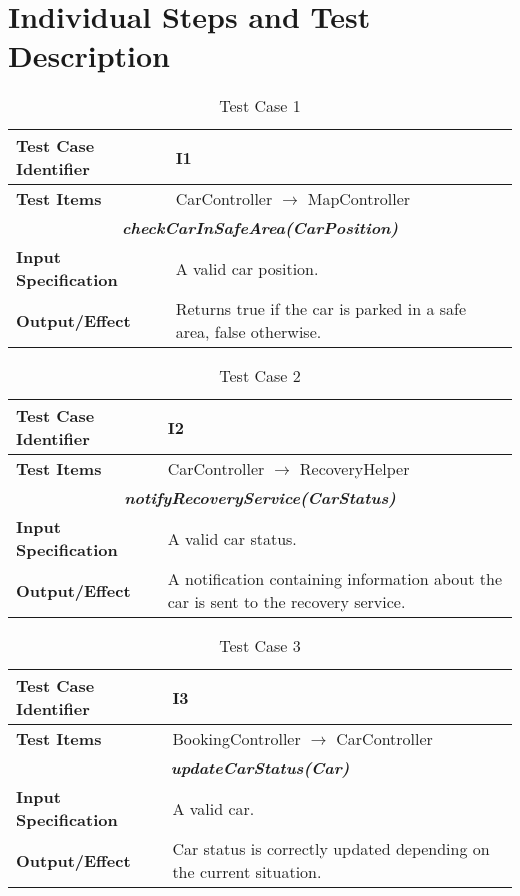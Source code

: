
\chapter{Individual Steps and Test Description}
\blindtext

\begin{table}[h]
	\begin{tabularx}{\textwidth}{l X}
		\hline
		\textbf{Test Case Identifier}	&	I1\\	\hline
		\textbf{Test Items}			&	CarController $\rightarrow$ MapController \\	\hline\hline
		\multicolumn{2}{c}{\textbf{\textit{checkCarInSafeArea(CarPosition)}}}	\\	\hline
			\textbf{Input Specification}	&	A valid car position.\\	\hline
			\textbf{Output/Effect}	&	Returns true if the car is parked in a safe area, false otherwise.\\	\hline
	\end{tabularx}
	\captionsetup{textformat=empty,labelformat=blank}
	\caption{Test Case 1}
	\label{table:template-table-1}
\end{table}

\begin{table}[h]
	\begin{tabularx}{\textwidth}{l X}
		\hline
		\textbf{Test Case Identifier}	&	I2\\	\hline
		\textbf{Test Items}			&	CarController $\rightarrow$ RecoveryHelper \\	\hline\hline
		\multicolumn{2}{c}{\textbf{\textit{notifyRecoveryService(CarStatus)}}}	\\	\hline
			\textbf{Input Specification}	&	A valid car status.\\	\hline
			\textbf{Output/Effect}	&	A notification containing information about the car is sent to the recovery service.\\	\hline
	\end{tabularx}
	\captionsetup{textformat=empty,labelformat=blank}
	\caption{Test Case 2}
	\label{table:template-table-2}
\end{table}

\begin{table}[h]
	\begin{tabularx}{\textwidth}{l X}
		\hline
		\textbf{Test Case Identifier}	&	I3\\	\hline
		\textbf{Test Items}			&	BookingController $\rightarrow$ CarController \\	\hline\hline
		\multicolumn{2}{c}{\textbf{\textit{updateCarStatus(Car)}}}	\\	\hline
			\textbf{Input Specification}	&	A valid car.\\	\hline
			\textbf{Output/Effect}	&	Car status is correctly updated depending on the current situation.\\	\hline
	\end{tabularx}
	\captionsetup{textformat=empty,labelformat=blank}
	\caption{Test Case 3}
	\label{table:template-table-3}
\end{table}

